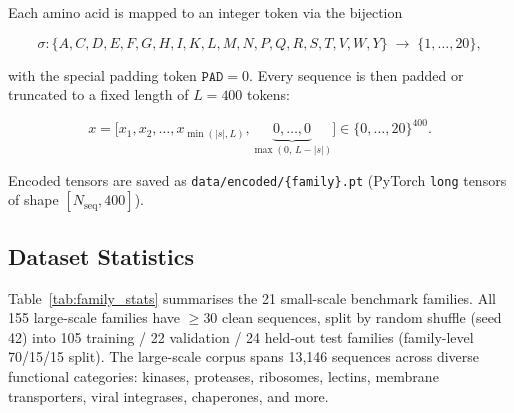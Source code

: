 \documentclass[11pt,a4paper]{article}
\begin{document}
Each amino acid is mapped to an integer token via the bijection

\[
  \sigma: \{A,C,D,E,F,G,H,I,K,L,M,N,P,Q,R,S,T,V,W,Y\} \;\to\; \{1,\ldots,20\},
\]

with the special padding token $\texttt{PAD} = 0$.  Every sequence is then
padded or truncated to a fixed length of $L = 400$ tokens:

\[
  x = \bigl[x_1, x_2, \ldots, x_{\min(|s|,L)}, \underbrace{0, \ldots, 0}_{
    \max(0,\, L - |s|)}\bigr] \in \{0,\ldots,20\}^{400}.
\]

Encoded tensors are saved as \texttt{data/encoded/\{family\}.pt} (PyTorch
\texttt{long} tensors of shape $[N_{\mathrm{seq}}, 400]$).

\subsection{Dataset Statistics}

Table~\ref{tab:family_stats} summarises the 21 small-scale benchmark families.
All 155 large-scale families have $\geq 30$ clean sequences, split by random shuffle (seed 42) into 105 training / 22 validation /
24 held-out test families (family-level 70/15/15 split).  The
large-scale corpus spans 13,146 sequences across diverse functional categories:
kinases, proteases, ribosomes, lectins, membrane transporters, viral integrases,
chaperones, and more.
\end{document}
